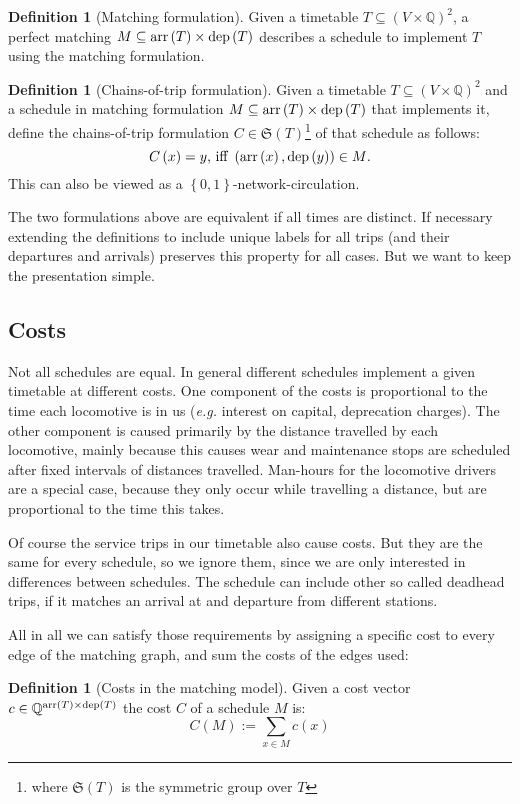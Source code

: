 \documentclass[a4paper]{amsart}
\theoremstyle{definition}
\newtheorem{defn}[theorem]{Definition}
\theoremstyle{remark}
\def\eg{\emph{e.g.}}
\newcommand\mpar[1]{\marginpar {\flushleft\sffamily\small #1}}
\newcommand{\todo}[1]{\mpar{#1}}
\newcommand{\rationals}{\ensuremath{\mathbb{Q}}}
\newcommand{\Sym}{\ensuremath{\mathfrak{S}}}
\newcommand{\lr}[1]{\ensuremath{\left( #1 \right)}}
\newcommand{\lrM}[1]{\ensuremath{\left\{ #1 \right\}}}
\begin{document}
\begin{defn}[Matching formulation]
  Given a timetable \(T \subseteq \left(V \times
    \rationals\right)^2\), a perfect matching \(M \subseteq \arr \lr{T} \times \dep \lr{T}\)
  describes a schedule to implement \(T\) using the matching formulation.
\end{defn}
\begin{defn}[Chains-of-trip formulation]
  Given a timetable \(T \subseteq \left(V \times \rationals\right)^2\)
  and a schedule in matching formulation \(M \subseteq \arr \lr{T}
  \times \dep \lr{T}\) that implements it,
  define the chains-of-trip formulation \(C \in \Sym\lr{T}\)\footnote{where \(\Sym \lr{T}\) is the symmetric group over \(T\)} of that schedule as follows:
  \[C \lr{x} = y\text{, iff }\lr{\arr\lr{x},\dep\lr{y}} \in M\text{.}\]
  This can also be viewed as a \(\lrM{0,1}\)-network-circulation.
\end{defn}

The two formulations above are equivalent if all times are distinct.
If necessary extending the definitions to include unique labels for
all trips (and their departures and arrivals) preserves this property
for all cases.  But we want to keep the presentation simple.

\subsection{Costs}

Not all schedules are equal.  In general different schedules implement
a given timetable at different costs.  One component of the costs is
proportional to the time each locomotive is in us (\eg{} interest on
capital, deprecation charges).  The other component is caused
primarily by the distance travelled by each locomotive, mainly because
this causes wear and maintenance stops are scheduled after fixed
intervals of distances travelled.  Man-hours for the locomotive
drivers \todo{Lokführer auf Englisch?} are a special case, because
they only occur while travelling a distance, but are proportional to
the time this takes.

Of course the service trips in our timetable also cause costs.  But
they are the same for every schedule, so we ignore them, since we are
only interested in differences between schedules.  The schedule can
include other so called deadhead trips, if it matches an arrival at
and departure from different stations.

All in all we can satisfy those requirements by assigning a specific
cost to every edge of the matching graph, and sum the costs of the
edges used:
\begin{defn}[Costs in the matching model]
  Given a cost vector \(c \in \rationals^{\arr \lr{T} \times \dep\lr{T}}\) the cost \(C\) of a schedule \(M\) is:
  \[C \lr{M} := \sum_{x \in M} c \lr{x}\]
\end{defn}
\end{document}
